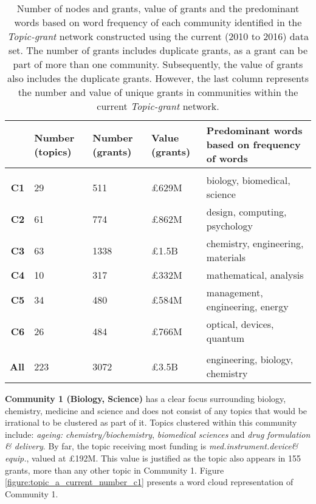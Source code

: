 \clearpage

\begin{table}[!htbp]
\centering
\caption[Number of nodes and grants, value of grants and the predominant words of each community in the \textit{Topic-grant} network constructed using the current (2010 to 2016) data set.]{Number of nodes and grants, value of grants and the predominant words based on word frequency of each community identified in the \textit{Topic-grant} network constructed using the current (2010 to 2016) data set. The number of grants includes duplicate grants, as a grant can be part of more than one community. Subsequently, the value of grants also includes the duplicate grants. However, the last column represents the number and value of unique grants in communities within the current \textit{Topic-grant} network.}
\label{table:topic_a_current_communities}
\begin{tabular}{r|>{\raggedleft\arraybackslash}p{1.6cm}>{\raggedleft\arraybackslash}p{1.6cm}>{\raggedleft\arraybackslash}p{1.6cm}>{\raggedleft\arraybackslash}p{6.4cm}}
{} & \textbf{Number (topics)} & \textbf{Number (grants)} & \textbf{Value (grants)} & \textbf{Predominant words based on frequency of words}\\
\hline\\
\textbf{C1}  & {29}  & {511}  & {\pounds629M}  & {biology, biomedical, science}\\
\textbf{C2}  & {61}  & {774}  & {\pounds862M}  & {design, computing, psychology}\\
\textbf{C3}  & {63}  & {1338} & {\pounds1.5B}  & {chemistry, engineering, materials}\\
\textbf{C4}  & {10}  & {317}  & {\pounds332M}  & {mathematical, analysis}\\
\textbf{C5}  & {34}  & {480}  & {\pounds584M}  & {management, engineering, energy}\\
\textbf{C6}  & {26}  & {484}  & {\pounds766M}  & {optical, devices, quantum}\\
\hline\\
\textbf{All} & {223} & {3072} & {\pounds3.5B}  & {engineering, biology, chemistry}\\
\end{tabular}
\end{table}

\noindent\textbf{Community 1 (Biology, Science)} has a clear focus surrounding biology, chemistry, medicine and science and does not consist of any topics that would be irrational to be clustered as part of it. Topics clustered within this community include: \textit{ageing: chemistry/biochemistry}, \textit{biomedical
sciences} and \textit{drug formulation \& delivery}. By far, the topic receiving most funding is \textit{med.instrument.device\& equip.}, valued at \pounds192M. This value is justified as the topic also appears in 155 grants, more than any other topic in Community 1. Figure \ref{figure:topic_a_current_number_c1} presents a word cloud representation of Community 1.

